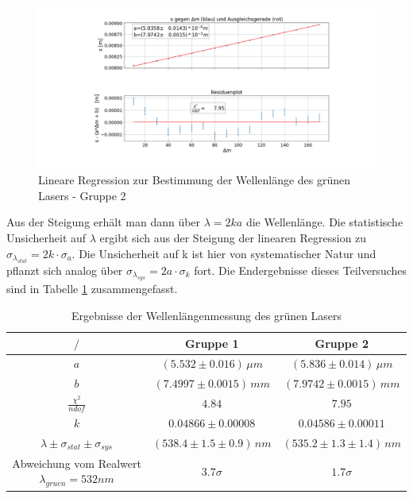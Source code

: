 \documentclass[a4paper, 11pt]{article}
\begin{document}
\begin{figure}[H]
	\hskip-4cm
	\includegraphics[scale=0.45]{./Bilder/Wellenlaengenbestimmung_2.png}
	\caption{Lineare Regression zur Bestimmung der Wellenlänge des grünen Lasers - Gruppe 2}
	\label{pic:lambda_2}	
\end{figure}

Aus der Steigung erhält man dann über $\lambda = 2 k a$ die Wellenlänge. Die statistische Unsicherheit auf $\lambda$ ergibt sich aus der Steigung der linearen Regression zu $\sigma_{\lambda_{stat}} = 2k \cdot \sigma_a$. Die Unsicherheit auf k ist hier von systematischer Natur und pflanzt sich analog über $\sigma_{\lambda_{sys}} = 2a \cdot \sigma_k$ fort. Die Endergebnisse dieses Teilversuches sind in Tabelle \ref{table:lambda_final} zusammengefasst.
\begin{table}[H]
	\renewcommand{\arraystretch}{1.5}
	\centering
	\begin{tabular}{|c|c|c|}
		\hline  $/$	&	Gruppe 1	&	Gruppe 2  	\\
		\hline	$a$ &	$ (5.532 \pm 0.016) \,\mu m$		&	$ (5.836 \pm 0.014)\, \mu m $ \\
		\hline  $b$	&	$ (7.4997 \pm 0.0015)\, mm$		&	$ (7.9742 \pm 0.0015)\, mm$ \\
		\hline $\frac{\chi^2}{ndof}$	&	$4.84$	&	$7.95$	\\
		\hline  $k$	&	$ 0.04866 \pm 0.00008 $		&	$ 0.04586 \pm 0.00011$ \\
		\hline $\lambda \pm \sigma_{stat} \pm \sigma_{sys}$	&	$ (538.4 \pm 1.5 \pm 0.9)\, nm$ &	$ (535.2 \pm 1.3 \pm 1.4)\, nm $ \\
		\hline Abweichung vom Realwert $\lambda_{gruen} = 532 nm$	&	$ 3.7 \sigma $		&	$ 1.7 \sigma $	\\
		\hline
	\end{tabular}
	\caption{Ergebnisse der Wellenlängenmessung des grünen Lasers}
	\label{table:lambda_final}
\end{table}
\end{document}

